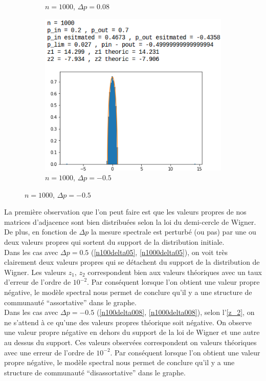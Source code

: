 \begin{figure}[p]
\begin{subfigure}{.5\textwidth}
		\caption{$n=1000$, $\Delta p=0.08$}
		\label{n1000delta008}
	\end{subfigure}
	\begin{subfigure}{.5\textwidth}
		\centering
		\includegraphics[scale=0.58]{static/spectral_n1000_pin02_pout07.png}
		\caption{$n=1000$, $\Delta p=-0.5$}
		\label{n1000delta-05}
	\end{subfigure}
\end{figure}

La première observation que l'on peut faire est que les valeurs propres de nos matrices d'adjacence sont bien distribuées selon la loi du demi-cercle de Wigner.
De plus, en fonction de $\Delta p$ la mesure spectrale est perturbé (ou pas) par une ou deux valeurs propres qui sortent du support de la distribution initiale.\\

Dans les cas avec $\Delta p = 0.5$ (\autoref{n100delta05}, \autoref{n1000delta05}), on voit très clairement deux valeurs propres qui se détachent du support de la distribution de Wigner.
Les valeurs $z_1$, $z_2$ correspondent bien aux valeurs théoriques avec un taux d'erreur de l'ordre de $10^{-2}$.
Par conséquent lorsque l'on obtient une valeur propre négative, le modèle spectral nous permet de conclure qu'il y a une structure de communauté ``assortative'' dans le graphe.\\

Dans les cas avec $\Delta p = -0.5$ (\autoref{n100delta008}, \autoref{n1000delta008}), selon l'\autoref{z_2}, on ne s'attend à ce qu'une des valeurs propres théorique soit négative.
On observe une valeur propre négative en dehors du support de la loi de Wigner et une autre au dessus du support.
Ces valeurs observées correspondent on valeurs théoriques avec une erreur de l'ordre de $10^{-2}$.
Par conséquent lorsque l'on obtient une valeur propre négative, le modèle spectral nous permet de conclure qu'il y a une structure de communauté ``disassortative'' dans le graphe.\\

